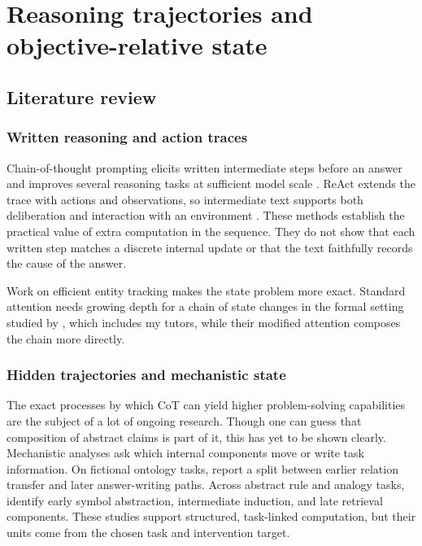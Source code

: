 \section{Reasoning trajectories and objective-relative state}
\label{sec:reasoning}

\subsection{Literature review}

\subsubsection{Written reasoning and action traces}

Chain-of-thought prompting elicits written intermediate steps before an answer and improves several reasoning tasks at sufficient model scale \parencite{wei2022chain}. ReAct extends the trace with actions and observations, so intermediate text supports both deliberation and interaction with an environment \parencite{yao2023react}. These methods establish the practical value of extra computation in the sequence. They do not show that each written step matches a discrete internal update or that the text faithfully records the cause of the answer.

Work on efficient entity tracking makes the state problem more exact. Standard attention needs growing depth for a chain of state changes in the formal setting studied by \textcite{fagnou2024chain}, which includes my tutors, while their modified attention composes the chain more directly.

\subsubsection{Hidden trajectories and mechanistic state}

The exact processes by which CoT can yield higher problem-solving capabilities are the subject of a lot of ongoing research. Though one can guess that composition of abstract claims is part of it, this has yet to be shown clearly. Mechanistic analyses ask which internal components move or write task information. On fictional ontology tasks, \textcite{dutta2024step} report a split between earlier relation transfer and later answer-writing paths. Across abstract rule and analogy tasks, \textcite{yang2025symbolic} identify early symbol abstraction, intermediate induction, and late retrieval components. These studies support structured, task-linked computation, but their units come from the chosen task and intervention target.


